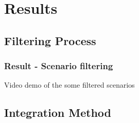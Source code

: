 
\section{Results}

\subsection{Filtering Process}

\begin{frame}
  \frametitle{Result - Scenario filtering}
  \center Video demo of the some filtered scenarios
\end{frame}


\subsection{Integration Method}

